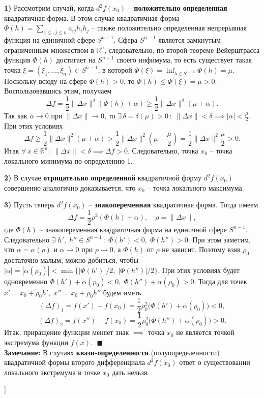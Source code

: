 \textbf{1)} Рассмотрим случай, когда $d^2 f(x_0)$ -- \textbf{положительно определенная} квадратичная форма. 
В этом случае квадратичная форма $\Phi(h) = \sum_{1\leq , j \leq n} a_{ij}h_i h_j$ -- также положительно определенная непрерывная функция на единичной сфере $S^{n-1}$. 
Сфера $S^{n-1}$ является замкнутым ограниченным множеством в $\mathbb{R}^n$, следовательно, по второй теореме Вейерштрасса функция $\Phi(h)$ достигает на $S^{n-1}$ своего инфимума, то есть существует такая точка $\xi = (\xi_1, \ldots, \xi_n) \in S^{n-1}$, в которой $\Phi(\xi) = \inf_{h \in S^{n-1}} \Phi(h) = \mu$. 
Поскольку всюду на сфере $\Phi(h) > 0$, то $\Phi(h) \leq \Phi(\xi) = \mu > 0$. Воспользовавшись этим, получаем 
$$
\Delta f = \frac{1}{2} \|\Delta x\|^2 (\Phi(h) + \alpha) \geq \frac{1}{2} \|\Delta x\|^2 (\mu + \alpha).
$$
Так как $\alpha \to 0$ при $\|\Delta x\| \to 0$, то $\exists \, \delta = \delta (\mu) > 0 \,:\; \|\Delta x\| < \delta \implies |\alpha| < \frac{\mu}{2}$.
При этих условиях 
$$
\Delta f \geq \frac{1}{2} \|\Delta x\|^2 (\mu + \alpha) > \frac{1}{2} \|\Delta x\|^2 (\mu - \frac{\mu}{2}) = \frac{1}{2} \|\Delta x\|^2 \frac{\mu}{2} > 0.
$$
Итак $\forall\, x \in \mathbb{R}^n : \; \|\Delta x\| < \delta \implies \Delta f > 0 $. Следовательно, точка $x_0$ -- точка локального минимума по определению 1.

\textbf{2)} В случае \textbf{отрицательно определенной} квадратичной форму $d^2 f(x_0)$ совершенно аналогично доказывается, что $x_0$ -- точка локального максимума.

\textbf{3)} Пусть теперь $d^2 f(x_0)$ -- \textbf{знакопеременная} квадратичная форма. Тогда имеем 
$$
\Delta f = \frac{1}{2} \rho^2 (\Phi(h) + \alpha),\quad \rho = \|\Delta x\|,
$$
где $\Phi(h)$ -- знакопеременная квадратичная форма на единичной сфере $S^{n-1}$. 
Следовательно $ \exists \; h', \; h'' \in S^{n-1} \,: \; \Phi(h') <0, \; \Phi(h'') > 0$. 
При этом заметим, что $\alpha = \alpha (\rho)$ и $\alpha \to 0$ при $\rho \to 0$, а $\Phi(h)$ от $\rho$ не зависит.
Поэтому взяв $\rho_0$ достаточно малым, можно добиться, чтобы $|\alpha| = |\alpha(\rho_0)| < \min \big\{|\Phi(h')| / 2, \;  |\Phi(h'')| / 2\big\}$. 
При этих условиях будет одновременно $ \Phi(h') + \alpha(\rho_0) < 0, \; \Phi(h'') + \alpha(\rho_0) > 0$. 
Тогда для точек $x' = x_0 + \rho_0 h', \; x'' = x_0 + \rho_0 h''$ будем иметь
$$
(\Delta f)_1 = f(x') - f(x_0) = \frac{1}{2} \rho_0^2 \big(\Phi(h') + \alpha(\rho_0) \big) < 0,
$$
$$
(\Delta f)_2 = f(x'') - f(x_0) = \frac{1}{2} \rho_0^2 \big(\Phi(h'') + \alpha(\rho_0) \big) > 0.
$$
Итак, приращение функции меняет знак $\implies$ точка $x_0$ не является точкой экстремума функции $f(x)$. $\;\blacksquare$\\

\textbf{Замечание:} В случаях \textbf{квази-определенности} (полуопределенности) квадратичной формы второго дифференциала $d^2 f(x_0)$ ответ о существовании локального экстремума в точке $x_0$ дать нельзя.


\bigbreak
[\cite[page 69-74]{Sadovn_func_mhogih}]
